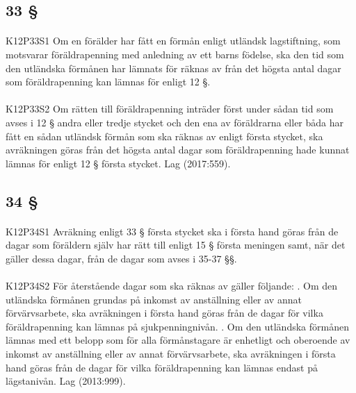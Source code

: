 \documentclass[a4paper,notitlepage,openany,10pt]{book}
\begin{document}
\subsection*{33 §}
\paragraph*{}
{\tiny K12P33S1}
Om en förälder har fått en förmån enligt utländsk lagstiftning, som motsvarar föräldrapenning med anledning av ett barns födelse, ska den tid som den utländska förmånen har lämnats för räknas av från det högsta antal dagar som föräldrapenning kan lämnas för enligt 12 §.
\paragraph*{}
{\tiny K12P33S2}
Om rätten till föräldrapenning inträder först under sådan tid som avses i 12 § andra eller tredje stycket och den ena av föräldrarna eller båda har fått en sådan utländsk förmån som ska räknas av enligt första stycket, ska avräkningen göras från det högsta antal dagar som föräldrapenning hade kunnat lämnas för enligt 12 § första stycket.
Lag (2017:559).
\subsection*{34 §}
\paragraph*{}
{\tiny K12P34S1}
Avräkning enligt 33 § första stycket ska i första hand göras från de dagar som föräldern själv har rätt till enligt 15 § första meningen samt, när det gäller dessa dagar, från de dagar som avses i 35-37 §§.
\paragraph*{}
{\tiny K12P34S2}
För återstående dagar som ska räknas av gäller följande:
. Om den utländska förmånen grundas på inkomst av anställning eller av annat förvärvsarbete, ska avräkningen i första hand göras från de dagar för vilka föräldrapenning kan lämnas på sjukpenningnivån.
. Om den utländska förmånen lämnas med ett belopp som för alla förmånstagare är enhetligt och oberoende av inkomst av anställning eller av annat förvärvsarbete, ska avräkningen i första hand göras från de dagar för vilka föräldrapenning kan lämnas endast på lägstanivån.
Lag (2013:999).
\end{document}

